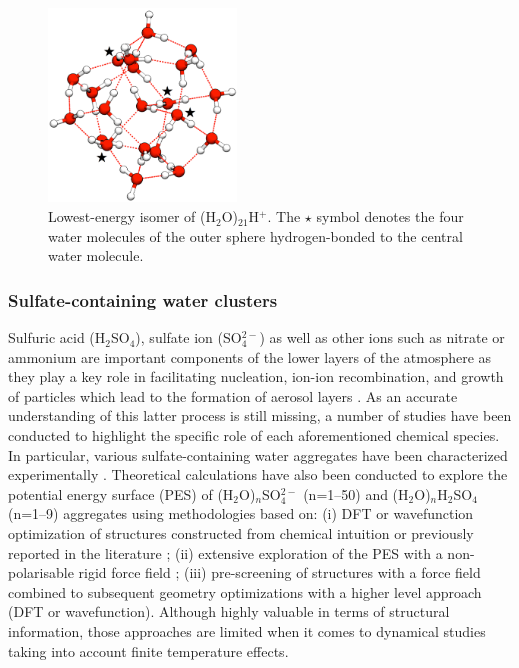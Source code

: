 \documentclass[]{interact}
\theoremstyle{plain}%
\theoremstyle{definition}
\theoremstyle{remark}
\begin{document}
\begin{figure}
\begin{center}
\includegraphics[width=5cm]{H2O21.png}
\end{center}
\caption{Lowest-energy isomer of (H$_{2}$O)$_{21}$H$^{+}$. The $\star$ symbol denotes the four
water molecules of the outer sphere hydrogen-bonded to the central water molecule.}
\label{h2o21}
\end{figure}

\subsubsection{Sulfate-containing water clusters} 

Sulfuric acid (H$_{2}$SO$_{4}$), sulfate ion (SO$_{4}^{2-}$) as well as other ions such as
nitrate or ammonium are important components of the lower layers of the atmosphere as they play a key role
in facilitating nucleation, ion-ion recombination, and growth of particles which lead to the formation of aerosol layers \cite{yu,shaw,kulmala,yu2,Metzger2010,Schobesberger2013,Kurten2014,Dunne2016,Lehtipalo2016, Boyer2017}.
As an accurate understanding of this latter process is still missing, a number of studies have been conducted
to highlight the specific role of each aforementioned chemical species.
In particular, various sulfate-containing water aggregates have been characterized experimentally \cite{wang2,Wang2001,Zhou2006,Bush2007,brein1,brein2,yang1,wang1}. Theoretical calculations have also been
conducted to explore the potential energy surface (PES) of (H$_{2}$O)$_{n}$SO$_{4}^{2-}$ (n=1--50) \cite{Zhou2006,brein1,brein2,pye1,whitehead,wong1,wang1,ohanessian,lambrecht1,wan,mardirossian,Smeeton2015,Hey2016} 
and (H$_{2}$O)$_{n}$H$_{2}$SO$_{4}$ (n=1--9) \cite{bandy1,arstila1,re1,ding2003,ding2004,miller3,miller2} aggregates using
methodologies based on: (i) DFT or wavefunction optimization of structures constructed from chemical intuition or previously
reported in the literature ; (ii) extensive exploration of the PES with a non-polarisable rigid force field ; (iii) pre-screening of structures
with a force  field combined to subsequent geometry optimizations with a higher level approach (DFT or wavefunction). Although
highly valuable in terms of structural information, those approaches are limited when it comes to dynamical studies taking into 
account finite temperature effects.
\end{document}
